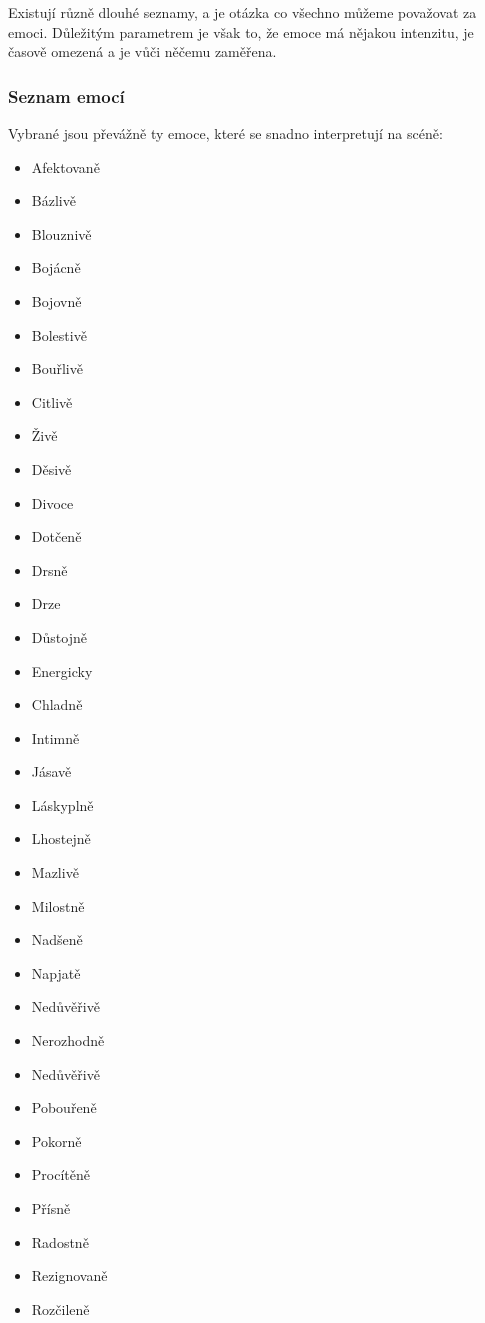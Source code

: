 Existují různě dlouhé seznamy, a je otázka co všechno můžeme považovat za emoci. 
Důležitým parametrem je však to, že emoce má nějakou intenzitu, je časově omezená a je vůči něčemu zaměřena. 
 
\subsubsection{Seznam emocí} Vybrané jsou převážně ty emoce, které se snadno interpretují na scéně: 
 
\begin{multicols}{3} 
\begin{itemize}
\item  Afektovaně
\item  Bázlivě
\item  Blouznivě
\item  Bojácně
\item  Bojovně
\item  Bolestivě
\item  Bouřlivě
\item  Citlivě
\item  Živě
\item  Děsivě
\item  Divoce
\item  Dotčeně
\item  Drsně
\item  Drze
\item  Důstojně
\item  Energicky
\item  Chladně
\item  Intimně
\item  Jásavě
\item  Láskyplně
\item  Lhostejně
\item  Mazlivě
\item  Milostně
\item  Nadšeně
\item  Napjatě
\item  Nedůvěřivě
\item  Nerozhodně
\item  Nedůvěřivě
\item  Pobouřeně
\item  Pokorně
\item  Procítěně
\item  Přísně
\item  Radostně
\item  Rezignovaně
\item  Rozčileně

\end{itemize}
\end{multicols}
